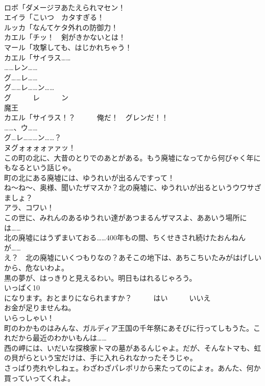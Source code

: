 \documentclass[8pt]{extreport}
\begin{document}
\begin{CJK}{UTF8}{min}
\\	ロボ「ダメージヲあたえられマセン！	
\\	エイラ「こいつ　カタすぎる！	
\\	ルッカ「なんてケタ外れの防御力！	
\\	カエル「チッ！　剣がきかないとは！	
\\	マール「攻撃しても、はじかれちゃう！	
\\	カエル「サイラス……	
\\	……レン……	
\\	グ……レ……	
\\	グ……レ……ン……	
\\	グ　　　レ　　　ン　　
\\	魔王
\\	カエル「サイラス！？　　　俺だ！　グレンだ！！	
\\	……、ウ……	
\\	グ…レ………ン……？	
\\	ヌグォォォォァァッ！	
\\	この町の北に、大昔のとりでのあとがある。もう廃墟になってから何びゃく年にもなるという話じゃ。	
\\	町の北にある廃墟には、ゆうれいが出るんですって！	
\\	ね～ね～、奥様、聞いたザマスか？北の廃墟に、ゆうれいが出るというウワサざましょ？	
\\	アラ、コワい！	
\\	この世に、みれんのあるゆうれい達があつまるんザマスよ、ああいう場所には……	
\\	北の廃墟にはうずまいておる……400年もの間、ちくせきされ続けたおんねんが……	
\\	え？　北の廃墟にいくつもりなの？あそこの地下は、あちこちいたみがはげしいから、危ないわよ。	
\\	黒の夢が、はっきりと見えるわい。明日もはれるじゃろう。	
\\	いっぱく10
\\	になります。おとまりになられますか？　　　はい　　　いいえ	
\\	お金が足りませんね。	
\\	いらっしゃい！	
\\	町のわかものはみんな、ガルディア王国の千年祭にあそびに行ってしもうた。これだから最近のわかいもんは……	
\\	西の岬には、いだいな探検家トマの墓があるんじゃよ。だが、そんなトマも、虹の貝がらという宝だけは、手に入れられなかったそうじゃ。	
\\	さっぱり売れやしねェ。わざわざパレポリから来たってのによォ。あんた、何か買っていってくれよ。	

\end{CJK}
\end{document}
